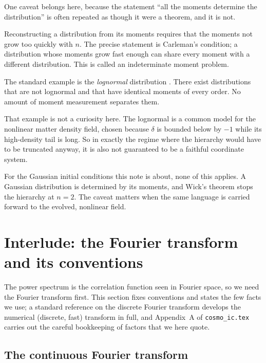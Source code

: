 \documentclass[12pt]{article}
\newcommand{\code}[1]{\texttt{#1}}
\begin{document}
One caveat belongs here, because the statement ``all the moments
determine the distribution'' is often repeated as though it were a
theorem, and it is not.

Reconstructing a distribution from its moments requires that the moments
not grow too quickly with $n$.  The precise statement is Carleman's
condition; a distribution whose moments grow fast enough can share every
moment with a different distribution.  This is called an indeterminate
moment problem.

The standard example is the \emph{lognormal} distribution
\citep{Heyde1963}.  There exist distributions that are not lognormal and
that have identical moments of every order.  No amount of moment
measurement separates them.

That example is not a curiosity here.  The lognormal is a common model
for the nonlinear matter density field, chosen because $\delta$ is
bounded below by $-1$ while its high-density tail is long.  So in exactly
the regime where the hierarchy would have to be truncated anyway, it is
also not guaranteed to be a faithful coordinate system.

For the Gaussian initial conditions this note is about, none of this
applies.  A Gaussian distribution is determined by its moments, and Wick's
theorem stops the hierarchy at $n = 2$.  The caveat matters when the same
language is carried forward to the evolved, nonlinear field.

\section{Interlude: the Fourier transform and its conventions}
\label{sec:fourier}

The power spectrum is the correlation function seen in Fourier space, so
we need the Fourier transform first.  This section fixes conventions and
states the few facts we use; a standard reference on the discrete Fourier transform develops
the numerical (discrete, fast) transform in full, and Appendix~A of
\code{cosmo\_ic.tex} carries out the careful bookkeeping of factors that
we here quote.

\subsection{The continuous Fourier transform}
\label{sec:cft}
\end{document}
